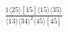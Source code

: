 \documentclass[varwidth, border=5pt]{standalone}
\begin{document}
\begin{my}
$\begin{gathered}
\scriptscriptstyle\frac{1⟨25⟩[15]⟨15⟩⟨35⟩}{⟨13⟩⟨34⟩^2⟨45⟩[45]}
\end{gathered}$
\end{my}
\end{document}
